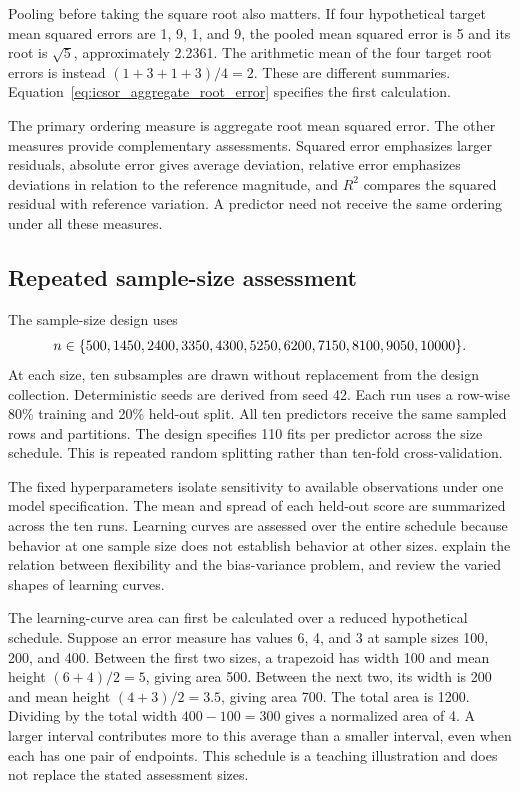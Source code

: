Pooling before taking the square root also matters. If four hypothetical target mean squared errors are 1, 9, 1, and 9, the pooled mean squared error is 5 and its root is \(\sqrt5\), approximately 2.2361. The arithmetic mean of the four target root errors is instead \((1+3+1+3)/4=2\). These are different summaries. Equation~\eqref{eq:icsor_aggregate_root_error} specifies the first calculation.

The primary ordering measure is aggregate root mean squared error. The other measures provide complementary assessments. Squared error emphasizes larger residuals, absolute error gives average deviation, relative error emphasizes deviations in relation to the reference magnitude, and \(R^2\) compares the squared residual with reference variation. A predictor need not receive the same ordering under all these measures.

\subsection{Repeated sample-size assessment}

The sample-size design uses
\begin{equation}
\equationname{Observation counts for structured-regression sample-size assessment}
\label{eq:icsor_assessment_sizes}
n\in\{500,1450,2400,3350,4300,5250,6200,7150,8100,9050,10000\}.
\end{equation}
At each size, ten subsamples are drawn without replacement from the design collection. Deterministic seeds are derived from seed 42. Each run uses a row-wise 80\% training and 20\% held-out split. All ten predictors receive the same sampled rows and partitions. The design specifies 110 fits per predictor across the size schedule. This is repeated random splitting rather than ten-fold cross-validation.

The fixed hyperparameters isolate sensitivity to available observations under one model specification. The mean and spread of each held-out score are summarized across the ten runs. Learning curves are assessed over the entire schedule because behavior at one sample size does not establish behavior at other sizes. \citet{Geman1992} explain the relation between flexibility and the bias-variance problem, and \citet{VieringLoog2023} review the varied shapes of learning curves.

The learning-curve area can first be calculated over a reduced hypothetical schedule. Suppose an error measure has values 6, 4, and 3 at sample sizes 100, 200, and 400. Between the first two sizes, a trapezoid has width 100 and mean height \((6+4)/2=5\), giving area 500. Between the next two, its width is 200 and mean height \((4+3)/2=3.5\), giving area 700. The total area is 1200. Dividing by the total width \(400-100=300\) gives a normalized area of 4. A larger interval contributes more to this average than a smaller interval, even when each has one pair of endpoints. This schedule is a teaching illustration and does not replace the stated assessment sizes.

